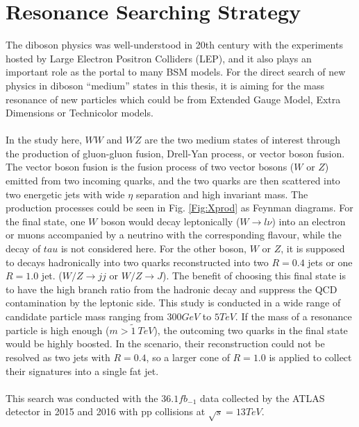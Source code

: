 \chapter{Resonance Searching Strategy}
The diboson physics was well-understood in 20th century with the experiments hosted by Large Electron Positron Colliders (LEP), and it also plays an important role as the portal to many BSM models. For the direct search of new physics in diboson ``medium'' states in this thesis, it is aiming for the mass resonance of new particles which could be from Extended Gauge Model, Extra Dimensions or Technicolor models.
\\
\\In the study here, $WW$ and $WZ$ are the two medium states of interest through the production of gluon-gluon fusion, Drell-Yan process, or vector boson fusion. The vector boson fusion is the fusion process of two vector bosons ($W$ or $Z$) emitted from two incoming quarks, and the two quarks are then scattered into two energetic jets with wide $\eta$ separation and high invariant mass. The production processes could be seen in Fig. \ref{Fig:Xprod} as Feynman diagrams. For the final state, one $W$ boson would decay leptonically ($W\rightarrow l\nu$) into an electron or muons accompanied by a neutrino with the corresponding flavour, while the decay of $tau$ is not considered here. For the other boson, $W$ or $Z$,  it is supposed to decays hadronically into two quarks reconstructed into two $R=0.4$ jets or one $R=1.0$ jet. ($W/Z\rightarrow jj$ or $W/Z\rightarrow J$). The benefit of choosing this final state is to have the high branch ratio from the hadronic decay and suppress the QCD contamination by the leptonic side. This study is conducted in a wide range of candidate particle mass ranging from $300GeV$ to $5TeV$. If the mass of a resonance particle is high enough ($m>\tilde1~TeV$), the outcoming two quarks in the final state would be highly boosted. In the scenario, their reconstruction could not be resolved as two jets with $R=0.4$, so a larger cone of $R=1.0$ is applied to collect their signatures into a single fat jet. 
\\
\\This search was conducted with the $36.1fb_{-1}$ data collected by the ATLAS detector in 2015 and 2016 with pp collisions at $\sqrt{s}=13TeV$. 

